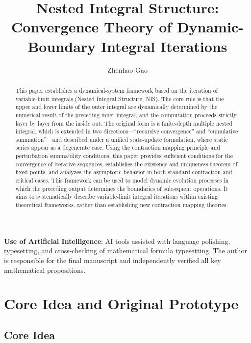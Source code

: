 \documentclass[11pt,a4paper]{amsart}
\title[Nested Integral Structure]{Nested Integral Structure: Convergence Theory of Dynamic-Boundary Integral Iterations}
\author{Zhenhao Gao}
\begin{document}
\begin{abstract}
This paper establishes a dynamical-system framework based on the iteration of variable-limit integrals (Nested Integral Structure, NIS). The core rule is that the upper and lower limits of the outer integral are dynamically determined by the numerical result of the preceding inner integral, and the computation proceeds strictly layer by layer from the inside out. The original form is a finite-depth multiple nested integral, which is extended in two directions---``recursive convergence'' and ``cumulative summation''---and described under a unified state-update formulation, where static series appear as a degenerate case. Using the contraction mapping principle and perturbation summability conditions, this paper provides sufficient conditions for the convergence of iterative sequences, establishes the existence and uniqueness theorem of fixed points, and analyzes the asymptotic behavior in both standard contraction and critical cases. This framework can be used to model dynamic evolution processes in which the preceding output determines the boundaries of subsequent operations. It aims to systematically describe variable-limit integral iterations within existing theoretical frameworks, rather than establishing new contraction mapping theories.
\end{abstract}


\maketitle

\noindent\textbf{Use of Artificial Intelligence}: AI tools assisted with language polishing, typesetting, and cross-checking of mathematical formula typesetting. The author is responsible for the final manuscript and independently verified all key mathematical propositions.

\bigskip

\section{Core Idea and Original Prototype}

\subsection{Core Idea}
\end{document}
